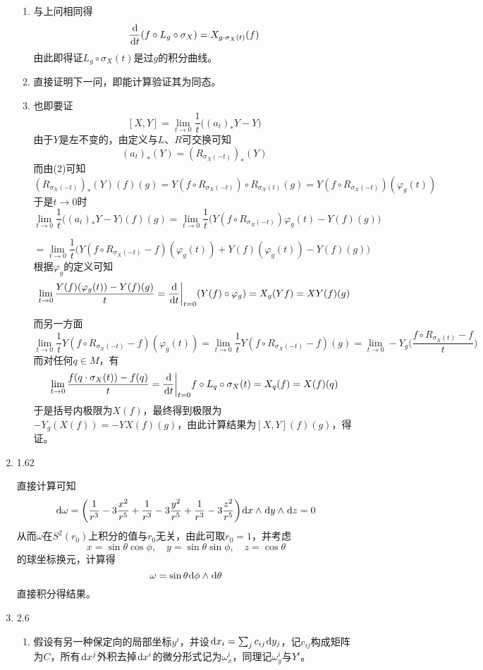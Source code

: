 \documentclass[a4paper,UTF8,fontset=windows,10pt]{ctexart}
\newcommand*{\dr}{\hspace{0.07em}\mathrm{d}}
\begin{document}
\begin{enumerate}
\begin{enumerate}[(1)]
        \item 与上问相同得
        $$\frac{\dr}{\dr t}(f\circ L_g\circ\sigma_X)=X_{g\cdot \sigma_X(t)}(f)$$
        由此即得证$L_g\circ\sigma_X(t)$是过$g$的积分曲线。
    
        \item 直接证明下一问，即能计算验证其为同态。
        
        \item 也即要证
        $$[X,Y]=\lim_{t\to 0}\frac{1}{t}\big((a_t)_*Y-Y\big)$$
        由于$Y$是左不变的，由定义与$L$、$R$可交换可知
        $$(a_t)_*(Y)=(R_{\sigma_X(-t)})_*(Y)$$
        而由(2)可知
        $$(R_{\sigma_X(-t)})_*(Y)(f)(g)=Y(f\circ R_{\sigma_X(-t)})\circ R_{\sigma_X(t)}(g)=Y(f\circ R_{\sigma_X(-t)})(\varphi_g(t))$$
        于是$t\to0$时
        $$\lim_{t\to 0}\frac{1}{t}\big((a_t)_*Y-Y\big)(f)(g)=\lim_{t\to 0}\frac{1}{t}\big(Y(f\circ R_{\sigma_X(-t)})\varphi_g(t)-Y(f)(g)\big)$$
    
        $$=\lim_{t\to 0}\frac{1}{t}\big(Y(f\circ R_{\sigma_X(-t)}-f)(\varphi_g(t))+Y(f)(\varphi_g(t))-Y(f)(g)\big)$$
        根据$\varphi_g$的定义可知
        $$\lim_{t\to0}\frac{Y(f)(\varphi_g(t))-Y(f)(g)}{t}=\frac{\dr}{\dr t}\bigg|_{t=0}(Y(f)\circ\varphi_g)=X_g(Yf)=XY(f)(g)$$
    
        而另一方面
        $$\lim_{t\to0}\frac{1}{t}Y(f\circ R_{\sigma_X(-t)}-f)(\varphi_g(t))=\lim_{t\to0}\frac{1}{t}Y(f\circ R_{\sigma_X(-t)}-f)(g)=\lim_{t\to0}-Y_g\bigg(\frac{f\circ R_{\sigma_X(t)}-f}{t}\bigg)$$
        而对任何$q\in M$，有
        $$\lim_{t\to0}\frac{f(q\cdot\sigma_X(t))-f(q)}{t}=\frac{\dr}{\dr t}\bigg|_{t=0}f\circ L_q\circ\sigma_X(t)=X_q(f)=X(f)(q)$$
        于是括号内极限为$X(f)$，最终得到极限为$-Y_g(X(f))=-YX(f)(g)$，由此计算结果为$[X,Y](f)(g)$，得证。
    \end{enumerate}
    
    \item 1.62
    
    直接计算可知
    $$\dr\omega=\bigg(\frac{1}{r^3}-3\frac{x^2}{r^5}+\frac{1}{r^3}-3\frac{y^2}{r^5}+\frac{1}{r^3}-3\frac{z^2}{r^5}\bigg)\dr x\wedge\dr y\wedge\dr z=0$$
    从而$\omega$在$S^2(r_0)$上积分的值与$r_0$无关，由此可取$r_0=1$，并考虑
    $$x=\sin\theta\cos\phi,\quad y=\sin\theta\sin\phi,\quad z=\cos\theta$$
    的球坐标换元，计算得
    $$\omega=\sin\theta\dr\phi\wedge\dr\theta$$
    直接积分得结果。
    
    \item 2.6
    
    \begin{enumerate}[(1)]
        \item 假设有另一种保定向的局部坐标$y^i$，并设$\dr x_i=\sum_jc_{ij}\dr y_j$，记$c_{ij}$构成矩阵为$C$，所有$\dr x^j$外积去掉$\dr x^i$的微分形式记为$\omega_x^i$，同理记$\omega_y^i$与$Y^i$。
    

\end{enumerate}
\end{enumerate}
\end{document}
